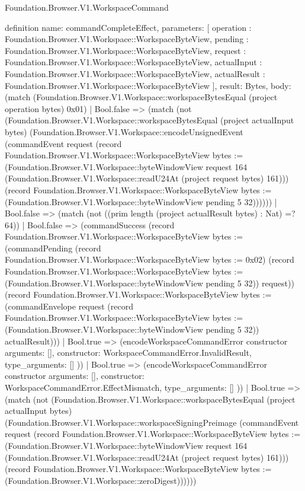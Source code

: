 \begin{lexlean}{Foundation.Browser.V1.WorkspaceCommand}
\begin{semanticmodule}
definition{
  name: commandCompleteEffect,
  parameters: [
    operation : Foundation.Browser.V1.Workspace::WorkspaceByteView,
    pending : Foundation.Browser.V1.Workspace::WorkspaceByteView,
    request : Foundation.Browser.V1.Workspace::WorkspaceByteView,
    actualInput : Foundation.Browser.V1.Workspace::WorkspaceByteView,
    actualResult : Foundation.Browser.V1.Workspace::WorkspaceByteView
  ],
  result: Bytes,
  body: (match (Foundation.Browser.V1.Workspace::workspaceBytesEqual (project operation bytes) 0x01)
    | Bool.false => (match (not (Foundation.Browser.V1.Workspace::workspaceBytesEqual (project actualInput bytes) (Foundation.Browser.V1.Workspace::encodeUnsignedEvent (commandEvent request (record Foundation.Browser.V1.Workspace::WorkspaceByteView {bytes := (Foundation.Browser.V1.Workspace::byteWindowView request 164 (Foundation.Browser.V1.Workspace::readU24At (project request bytes) 161))}) (record Foundation.Browser.V1.Workspace::WorkspaceByteView {bytes := (Foundation.Browser.V1.Workspace::byteWindowView pending 5 32)})))))
      | Bool.false => (match (not ((prim length (project actualResult bytes) : Nat) =? 64))
        | Bool.false => (commandSuccess (record Foundation.Browser.V1.Workspace::WorkspaceByteView {bytes := (commandPending (record Foundation.Browser.V1.Workspace::WorkspaceByteView {bytes := 0x02}) (record Foundation.Browser.V1.Workspace::WorkspaceByteView {bytes := (Foundation.Browser.V1.Workspace::byteWindowView pending 5 32)}) request)}) (record Foundation.Browser.V1.Workspace::WorkspaceByteView {bytes := (commandEnvelope request (record Foundation.Browser.V1.Workspace::WorkspaceByteView {bytes := (Foundation.Browser.V1.Workspace::byteWindowView pending 5 32)}) actualResult)}))
        | Bool.true => (encodeWorkspaceCommandError constructor{
          arguments: [],
          constructor: WorkspaceCommandError.InvalidResult,
          type_arguments: []
        }))
      | Bool.true => (encodeWorkspaceCommandError constructor{
        arguments: [],
        constructor: WorkspaceCommandError.EffectMismatch,
        type_arguments: []
      }))
    | Bool.true => (match (not (Foundation.Browser.V1.Workspace::workspaceBytesEqual (project actualInput bytes) (Foundation.Browser.V1.Workspace::workspaceSigningPreimage (commandEvent request (record Foundation.Browser.V1.Workspace::WorkspaceByteView {bytes := (Foundation.Browser.V1.Workspace::byteWindowView request 164 (Foundation.Browser.V1.Workspace::readU24At (project request bytes) 161))}) (record Foundation.Browser.V1.Workspace::WorkspaceByteView {bytes := (Foundation.Browser.V1.Workspace::zeroDigest)})))))
}
\end{semanticmodule}
\end{lexlean}
